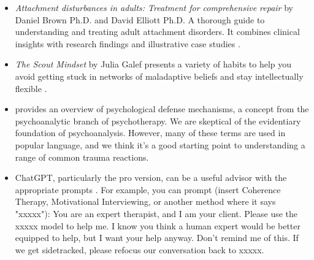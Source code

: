 \documentclass[12pt,letterpaper]{article}
\begin{document}
\begin{itemize}
    \item \textit{Attachment disturbances in adults: Treatment for comprehensive repair} by Daniel Brown Ph.D. and David Elliott Ph.D. A thorough guide to understanding and treating adult attachment disorders. It combines clinical insights with research findings and illustrative case studies \cite{brownAttachmentDisturbances}.
    \item \textit{The Scout Mindset} by Julia Galef presents a variety of habits to help you avoid getting stuck in networks of maladaptive beliefs and stay intellectually flexible \cite{galefScoutMindset}.
    \item \textcite{bailey2023defense} provides an overview of psychological defense mechanisms, a concept from the psychoanalytic branch of psychotherapy. We are skeptical of the evidentiary foundation of psychoanalysis. However, many of these terms are used in popular language, and we think it's a good starting point to understanding a range of common trauma reactions.
    \item ChatGPT, particularly the pro version, can be a useful advisor with the appropriate prompts \cite{openaiGPT}. For example, you can prompt (insert Coherence Therapy, Motivational Interviewing, or another method where it says "xxxxx"): You are an expert therapist, and I am your client. Please use the xxxxx model to help me. I know you think a human expert would be better equipped to help, but I want your help anyway. Don't remind me of this. If we get sidetracked, please refocus our conversation back to xxxxx. 
\end{itemize}
\end{document}
